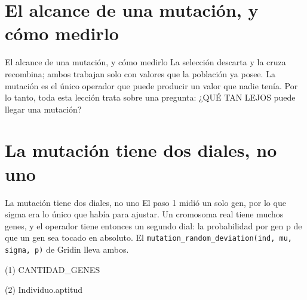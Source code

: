 \section{El alcance de una mutación, y cómo medirlo}

\begin{frame}{El alcance de una mutación, y cómo medirlo}
La selección descarta y la cruza recombina; ambos trabajan solo con valores que la
población ya posee. La mutación es el único operador que puede producir un valor
que nadie tenía. Por lo tanto, toda esta lección trata sobre una pregunta: ¿QUÉ TAN LEJOS
puede llegar una mutación?
\end{frame}


\section{La mutación tiene dos diales, no uno}

\begin{frame}{La mutación tiene dos diales, no uno}
El paso 1 midió un solo gen, por lo que sigma era lo único que había para ajustar.
Un cromosoma real tiene muchos genes, y el operador tiene entonces un segundo dial: la
probabilidad por gen p de que un gen sea tocado en absoluto. El
\texttt{mutation\_random\_deviation(ind, mu, sigma, p)} de Gridin lleva ambos.
\end{frame}

\begin{frame}[fragile]{(1) CANTIDAD\_GENES}

\end{frame}

\begin{frame}[fragile]{(2) Individuo.aptitud}

\end{frame}

